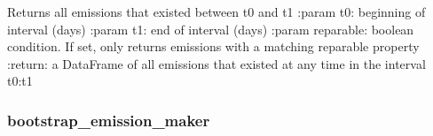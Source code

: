 \documentclass[letterpaper,10pt,english]{sphinxmanual}
\begin{document}
\begin{fulllineitems}

\begin{fulllineitems}
\label{\detokenize{index:feast.EmissionSimModules.emission_class_functions.Emission.get_emissions_in_range}}
Returns all emissions that existed between t0 and t1
:param t0: beginning of interval (days)
:param t1: end of interval (days)
:param reparable: boolean condition. If set, only returns emissions with a matching reparable property
:return: a DataFrame of all emissions that existed at any time in the interval t0:t1

\end{fulllineitems}


\end{fulllineitems}



\subsubsection{bootstrap\_emission\_maker}
\label{\detokenize{index:bootstrap-emission-maker}}
\end{document}
